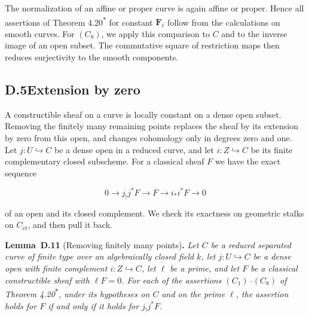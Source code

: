 \documentclass[11pt]{article}
\newenvironment{bpstatement}[2]{\par\addvspace{0.6\baselineskip}\noindent\textbf{#1}#2\textbf{.}\enspace\ignorespaces}
  {\par\addvspace{0.4\baselineskip}}
\newenvironment{bpstatementit}[2]{\begin{bpstatement}{#1}{#2}\itshape\ignorespaces}{\end{bpstatement}}
\newcommand{\bpout}[1]{#1\textsuperscript{\hyperlink{bp-outside}{\ensuremath{\ast}}}}
\begin{document}
The normalization of an affine or proper curve is again affine or proper. Hence all assertions of Theorem \bpout{4.20} for constant \(\mathbf F_\ell\) follow from the calculations on smooth curves. For \((C_8)\), we apply this comparison to \(C\) and to the inverse image of an open subset. The commutative square of restriction maps then reduces surjectivity to the smooth components.


\subsection*{\texorpdfstring{D.5\quad Extension by zero}{D.5 Extension by zero}}
\label{bp208}%
\label{bp209}%
A constructible sheaf on a curve is locally constant on a dense open subset. Removing the finitely many remaining points replaces the sheaf by its extension by zero from this open, and changes cohomology only in degrees zero and one. Let \(j:U\hookrightarrow C\) be a dense open in a reduced curve, and let \(i:Z\hookrightarrow C\) be its finite complementary closed subscheme. For a classical sheaf \(F\) we have the exact sequence

\[
0\longrightarrow j_!j^*F\longrightarrow F
\longrightarrow i_*i^*F\longrightarrow0
\]

of an open and its closed complement. We check its exactness on geometric stalks on \(C_{\acute{e}t}\), and then pull it back.

\label{bp210}%
\begin{bpstatementit}{Lemma~D.11}{ (Removing finitely many points)}
Let \(C\) be a reduced separated curve of finite type over an algebraically closed field \(k\), let \(j:U\hookrightarrow C\) be a dense open with finite complement \(i:Z\hookrightarrow C\), let \(\ell\) be a prime, and let \(F\) be a classical constructible sheaf with \(\ell F=0\). For each of the assertions \((C_1)\)–\((C_8)\) of Theorem \bpout{4.20}, under its hypotheses on \(C\) and on the prime \(\ell\), the assertion holds for \(F\) if and only if it holds for \(j_!j^*F\).
\end{bpstatementit}
\end{document}

